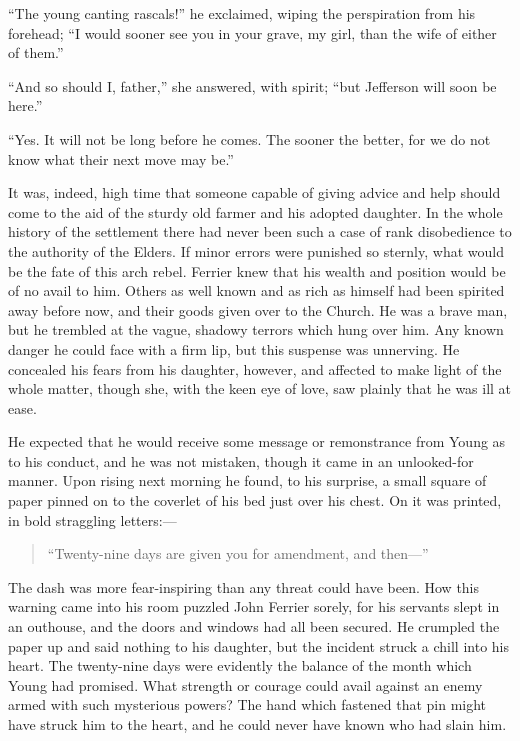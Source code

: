 \documentclass[12pt,english,oneside]{book}
\newcommand{\mdsh}[1]{\mbox{#1}\linebreak[1]}
\begin{document}
{}``The young canting rascals!'' he exclaimed, wiping the perspiration
from his forehead; {}``I would sooner see you in your grave, my girl,
than the wife of either of them.''

{}``And so should I, father,'' she answered, with spirit; {}``but
Jefferson will soon be here.''

{}``Yes. It will not be long before he comes. The sooner the better,
for we do not know what their next move may be.''

It was, indeed, high time that someone capable of giving advice and
help should come to the aid of the sturdy old farmer and his adopted
daughter. In the whole history of the settlement there had never been
such a case of rank disobedience to the authority of the Elders. If
minor errors were punished so sternly, what would be the fate of this
arch rebel. Ferrier knew that his wealth and position would be of
no avail to him. Others as well known and as rich as himself had been
spirited away before now, and their goods given over to the Church.
He was a brave man, but he trembled at the vague, shadowy terrors
which hung over him. Any known danger he could face with a firm lip,
but this suspense was unnerving. He concealed his fears from his daughter,
however, and affected to make light of the whole matter, though she,
with the keen eye of love, saw plainly that he was ill at ease.

He expected that he would receive some message or remonstrance from
Young as to his conduct, and he was not mistaken, though it came in
an unlooked-for manner. Upon rising next morning he found, to his
surprise, a small square of paper pinned on to the coverlet of his
bed just over his chest. On it was printed, in bold straggling letters:\mdsh{---}

\begin{center} \begin{quote} \sc

``Twenty-nine days are given you for amendment, and then---''

\end{quote} \end{center}

The dash was more fear-inspiring than any threat could have been.
How this warning came into his room puzzled John Ferrier sorely, for
his servants slept in an outhouse, and the doors and windows had all
been secured. He crumpled the paper up and said nothing to his daughter,
but the incident struck a chill into his heart. The twenty-nine days
were evidently the balance of the month which Young had promised.
What strength or courage could avail against an enemy armed with such
mysterious powers? The hand which fastened that pin might have struck
him to the heart, and he could never have known who had slain him.
\end{document}
